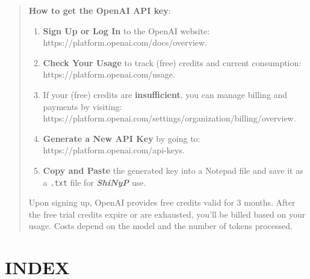 \documentclass[
]{book}
\begin{document}
\begin{quote}
\textbf{How to get the OpenAI API key}:

\begin{enumerate}
\def\labelenumi{\arabic{enumi}.}
\item
  \textbf{Sign Up or Log In} to the OpenAI website: https://platform.openai.com/docs/overview.
\item
  \textbf{Check Your Usage} to track (free) credits and current consumption: https://platform.openai.com/usage.
\item
  If your (free) credits are \textbf{insufficient}, you can manage billing and payments by visiting: https://platform.openai.com/settings/organization/billing/overview.
\item
  \textbf{Generate a New API Key} by going to: https://platform.openai.com/api-keys.
\item
  \textbf{Copy and Paste} the generated key into a Notepad file and save it as a \texttt{.txt} file for {\textbf{\emph{ShiNyP}}} use.
\end{enumerate}

Upon signing up, OpenAI provides free credits valid for 3 months. After the free trial credits expire or are exhausted, you'll be billed based on your usage. Costs depend on the model and the number of tokens processed.
\end{quote}

\chapter{INDEX}\label{sec-index}
\end{document}
